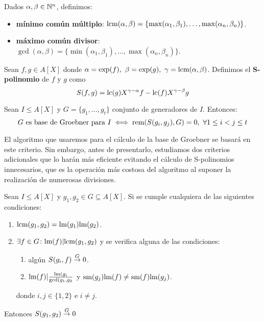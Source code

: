 \begin{definicion}
    Dados $\alpha,\beta \in \mathbb{N}^n$, definimos:
    \begin{itemize}
        \item \textbf{mínimo común múltiplo}: $\text{lcm}(\alpha,\beta) = \{\max(\alpha_1, \beta_1),\dots, \max(\alpha_n, \beta_n)\}$.
        \item \textbf{máximo común divisor}: $\gcd(\alpha,\beta) = \{\min(\alpha_1, \beta_1),\dots, \max(\alpha_n, \beta_n)\}$.
    \end{itemize}
\end{definicion}

\begin{definicion}
    Sean $f,g \in A[X]$ donde $\alpha=\exp(f),\ \beta=\exp(g),\ \gamma = \text{lcm}(\alpha,\beta)$. Definimos el \textbf{S-polinomio} de $f$ y $g$ como
    \begin{equation*}
        S(f,g) = \text{lc}(g)X^{\gamma-\alpha}f - \text{lc}(f)X^{\gamma-\beta}g
    \end{equation*}
\end{definicion}

\begin{teorema}\label{t:criterio}
    Sean $I\le A[X]$ y $G=\{g_1,\dots, g_t\}$ conjunto de generadores de $I$. Entonces:
    \begin{equation*}
        G \text{ es base de Groebner para } I \iff \text{rem}(S(g_i,g_j), G)=0,\ \forall 1\le i<j\le t
    \end{equation*}
\end{teorema}

El algoritmo que usaremos para el cálculo de la base de Groebner se basará en este criterio. Sin embargo, antes de presentarlo, estudiamos dos criterios adicionales que lo harán más eficiente evitando el cálculo de S-polinomios innecesarios, que es la operación más costosa del algoritmo al suponer la realización de numerosas divisiones.

\begin{teorema}\label{t:criterios}
    Sean $I\le A[X]$ y $g_1,g_2 \in G\subseteq A[X]$. Si se cumple cualquiera de las siguientes condiciones:
    \begin{enumerate}
        \item $\text{lcm}(g_1,g_2) = \text{lm}(g_1)\text{lm}(g_2)$.
        \item $\exists f\in G \colon \text{lm}(f) \vert \text{lcm}(g_1,g_2)$ y se verifica alguna de las condiciones:
        \begin{enumerate}
            \item algún $S(g_i,f)\stackrel{G}{\to} 0$.
            \item $\text{lm}(f)\vert \frac{\text{lm}(g_i}{\text{gcd}(g_1,g_2}$ y $\text{sm}(g_j)\text{lm}(f) \neq \text{sm}(f)\text{lm}(g_j)$.
        \end{enumerate}
        donde $i,j\in\{1,2\}$ e $i\neq j$.
    \end{enumerate}
    Entonces $S(g_1,g_2)\stackrel{G}{\to} 0$
\end{teorema}

